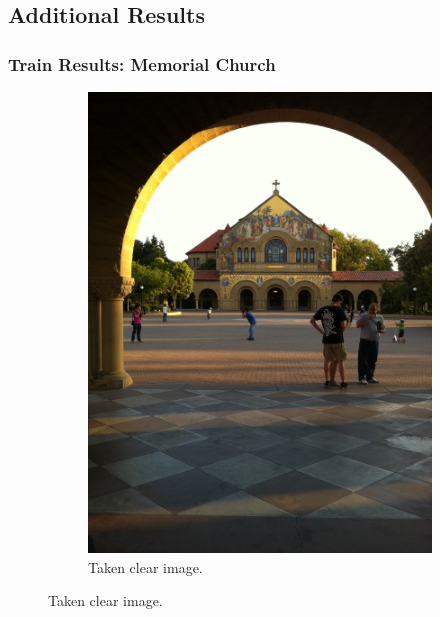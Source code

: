 \graphicspath{{mehul_pics/}}%

\subsection{Additional Results}
\subsubsection{Train Results: Memorial Church}

\begin{figure}[H]
        \centering
        \begin{subfigure}[b]{0.35\textwidth}
                \centering
                \includegraphics[width=\textwidth]{memchu.jpg}
                \caption{Taken clear image.}
        \end{subfigure}
        

\end{figure}
